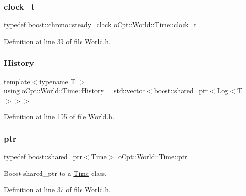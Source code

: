\subsubsection{\texorpdfstring{clock\+\_\+t}{clock\_t}}
{\footnotesize\ttfamily typedef boost\+::chrono\+::steady\+\_\+clock \hyperlink{classo_cpt_1_1_world_1_1_time_ac41de01610f32d0ace4844ed3bf454f7}{o\+Cpt\+::\+World\+::\+Time\+::clock\+\_\+t}}



Definition at line 39 of file World.\+h.

\hypertarget{classo_cpt_1_1_world_1_1_time_a7c51955f1bccc0f26b8a3d35599b6135}{}\label{classo_cpt_1_1_world_1_1_time_a7c51955f1bccc0f26b8a3d35599b6135} 
\subsubsection{\texorpdfstring{History}{History}}
{\footnotesize\ttfamily template$<$typename T $>$ \\
using \hyperlink{classo_cpt_1_1_world_1_1_time_a7c51955f1bccc0f26b8a3d35599b6135}{o\+Cpt\+::\+World\+::\+Time\+::\+History} =  std\+::vector$<$boost\+::shared\+\_\+ptr$<$\hyperlink{classo_cpt_1_1_world_1_1_time_1_1_log}{Log}$<$T$>$$>$$>$}



Definition at line 105 of file World.\+h.

\hypertarget{classo_cpt_1_1_world_1_1_time_ae99716d20374e14ec5053765a9921ef2}{}\label{classo_cpt_1_1_world_1_1_time_ae99716d20374e14ec5053765a9921ef2} 
\subsubsection{\texorpdfstring{ptr}{ptr}}
{\footnotesize\ttfamily typedef boost\+::shared\+\_\+ptr$<$\hyperlink{classo_cpt_1_1_world_1_1_time}{Time}$>$ \hyperlink{classo_cpt_1_1_world_1_1_time_ae99716d20374e14ec5053765a9921ef2}{o\+Cpt\+::\+World\+::\+Time\+::ptr}}



Boost shared\+\_\+ptr to a \hyperlink{classo_cpt_1_1_world_1_1_time}{Time} class. 



Definition at line 37 of file World.\+h.

